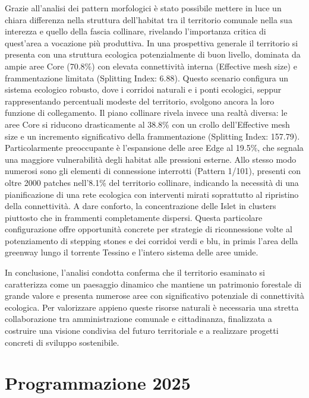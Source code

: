 \documentclass[
]{book}
\begin{document}
Grazie all'analisi dei pattern morfologici è stato possibile mettere in luce un chiara differenza nella struttura dell'habitat tra il territorio comunale nella sua interezza e quello della fascia collinare, rivelando l'importanza critica di quest'area a vocazione più produttiva. In una prospettiva generale il territorio si presenta con una struttura ecologica potenzialmente di buon livello, dominata da ampie aree Core (70.8\%) con elevata connettività interna (Effective mesh size) e frammentazione limitata (Splitting Index: 6.88). Questo scenario configura un sistema ecologico robusto, dove i corridoi naturali e i ponti ecologici, seppur rappresentando percentuali modeste del territorio, svolgono ancora la loro funzione di collegamento. Il piano collinare rivela invece una realtà diversa: le aree Core si riducono drasticamente al 38.8\% con un crollo dell'Effective mesh size e un incremento significativo della frammentazione (Splitting Index: 157.79). Particolarmente preoccupante è l'espansione delle aree Edge al 19.5\%, che segnala una maggiore vulnerabilità degli habitat alle pressioni esterne. Allo stesso modo numerosi sono gli elementi di connessione interrotti (Pattern 1/101), presenti con oltre 2000 patches nell'8.1\% del territorio collinare, indicando la necessità di una pianificazione di una rete ecologica con interventi mirati soprattutto al ripristino della connettività. A dare conforto, la concentrazione delle Islet in clusters piuttosto che in frammenti completamente dispersi. Questa particolare configurazione offre opportunità concrete per strategie di riconnessione volte al potenziamento di stepping stones e dei corridoi verdi e blu, in primis l'area della greenway lungo il torrente Tessino e l'intero sistema delle aree umide.

In conclusione, l'analisi condotta conferma che il territorio esaminato si caratterizza come un paesaggio dinamico che mantiene un patrimonio forestale di grande valore e presenta numerose aree con significativo potenziale di connettività ecologica. Per valorizzare appieno queste risorse naturali è necessaria una stretta collaborazione tra amministrazione comunale e cittadinanza, finalizzata a costruire una visione condivisa del futuro territoriale e a realizzare progetti concreti di sviluppo sostenibile.

\chapter{Programmazione 2025}\label{programmazione-2025}
\end{document}
